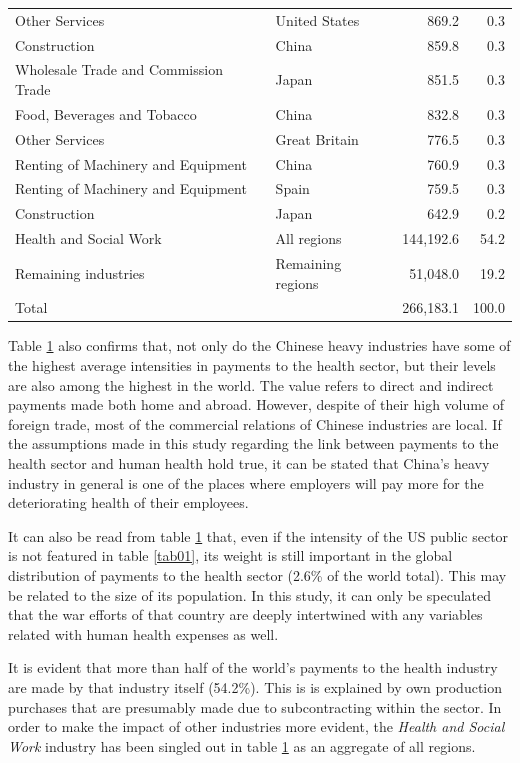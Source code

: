 \documentclass[a4paper,12pt]{article}
\begin{document}
\begin{table}
\begin{center}
\begin{tabular}{llrr}
Other Services & United States &  869.2  & 0.3\\ 
Construction & China &  859.8  & 0.3\\ 
Wholesale Trade and Commission Trade & Japan &  851.5  & 0.3\\ 
Food, Beverages and Tobacco & China &  832.8  & 0.3\\ 
Other Services & Great Britain &  776.5  & 0.3\\ 
Renting of Machinery and Equipment & China &  760.9  & 0.3\\ 
Renting of Machinery and Equipment & Spain &  759.5  & 0.3\\ 
Construction & Japan &  642.9  & 0.2\\
\hline
Health and Social Work & All regions & 144,192.6  & 54.2 \\
Remaining industries & Remaining regions &  51,048.0  &  19.2 \\
\hline
Total &  &   266,183.1   &  100.0 \\
\hline
\end{tabular}
\label{tab02} 
\end{center}
\end{table}

Table \ref{tab02} also confirms that, not only do the Chinese heavy industries have some of the highest average intensities in payments to the health sector, but their levels are also among the highest in the world. The value refers to direct and indirect payments made both home and abroad. However, despite of their high volume of foreign trade, most of the commercial relations of Chinese industries are local. If the assumptions made in this study regarding the link between payments to the health sector and human health hold true, it can be stated that China's heavy industry in general is one of the places where employers will pay more for the deteriorating health of their employees.

It can also be read from table \ref{tab02} that, even if the intensity of the US public sector is not featured in table \ref{tab01}, its weight is still important in the global distribution of payments to the health sector (2.6\% of the world total). This may be related to the size of its population. In this study, it can only be speculated that the war efforts of that country are deeply intertwined with any variables related with human health expenses as well. 

It is evident that more than half of the world's payments to the health industry are made by that industry itself (54.2\%). This is is explained by own production purchases that are presumably made due to subcontracting within the sector. In order to make the impact of other industries more evident, the \textit{Health and Social Work} industry has been singled out in table \ref{tab02} as an aggregate of all regions.
\end{document}
